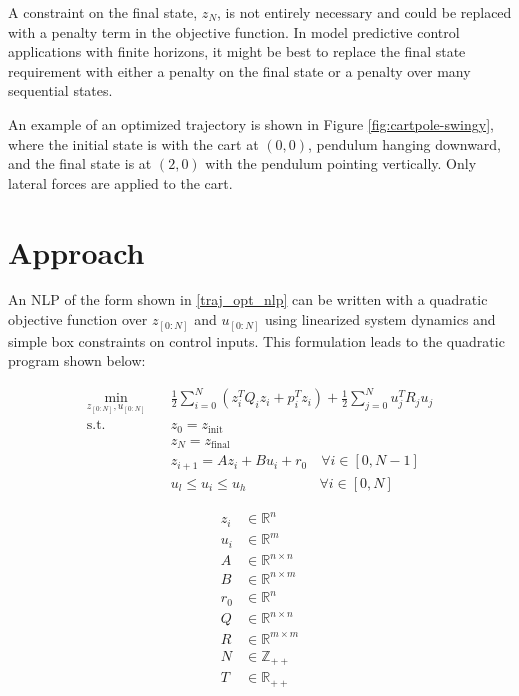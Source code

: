 \documentclass{exam}
\begin{document}
\begin{multicols*}{2}

A constraint on the final state, $z_N$, is not entirely necessary and could be replaced with a penalty term in the objective function. In model predictive control applications with finite horizons, it might be best to replace the final state requirement with either a penalty on the final state or a penalty over many sequential states.

An example of an optimized trajectory is shown in Figure \ref{fig:cartpole-swingy}, where the initial state is with the cart at $(0, 0)$, pendulum hanging downward, and the final state is at $(2, 0)$ with the pendulum pointing vertically. Only lateral forces are applied to the cart.

\section{Approach}
An NLP of the form shown in \eqref{traj_opt_nlp} can be written with a quadratic objective function over $z_{[0:N]}$ and $u_{[0:N]}$ using linearized system dynamics and simple box constraints on control inputs. This formulation leads to the quadratic program shown below:

\begin{equation}
    \label{opt_prob}
    \begin{aligned}
        \min_{z_{[0:N]}, u_{[0:N]}} \quad & \frac{1}{2}\sum_{i=0}^{N} \left( z_i^T Q_i z_i + p_i^T z_i \right) + \frac{1}{2}\sum_{j=0}^N u_j^T R_j u_j \\
        \textrm{s.t.} \quad & z_0 = z_{\textrm{init}} \\
        \quad & z_N = z_{\textrm{final}} \\
        \quad & z_{i+1} = A z_i + B u_i + r_0 \quad \forall i \in [0, N-1] \\
        \quad & u_l \leq u_i \leq u_h ~\quad\quad\quad\quad\quad \forall i \in [0, N]
    \end{aligned}
\end{equation}

\begin{equation}
    \begin{aligned}
        z_i &\in \mathbb{R}^n \\
        u_i &\in \mathbb{R}^m \\
        A &\in \mathbb{R}^{n \times n} \\
        B &\in \mathbb{R}^{n \times m} \\
        r_0 &\in \mathbb{R}^n \\
        Q &\in \mathbb{R}^{n \times n} \\
        R &\in \mathbb{R}^{m \times m} \\
        N &\in \mathbb{Z_{++}} \\
        T &\in \mathbb{R_{++}}
    \end{aligned}
\end{equation}


\end{multicols*}
\end{document}

